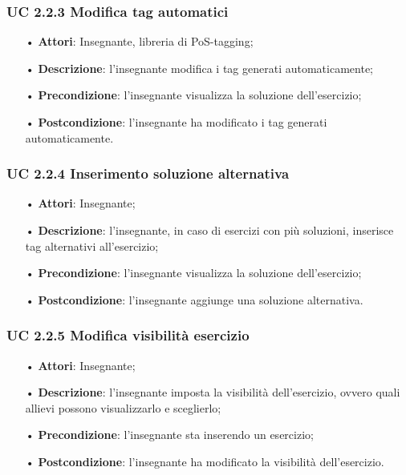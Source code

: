 \subsubsection{UC 2.2.3 Modifica tag automatici}
\begin{itemize}
	\item[•] \textbf{Attori}: Insegnante, libreria di PoS-tagging;
	\item[•] \textbf{Descrizione}: l’insegnante modifica i tag generati automaticamente;
	\item[•] \textbf{Precondizione}: l'insegnante visualizza la soluzione dell'esercizio;
	\item[•] \textbf{Postcondizione}: l'insegnante ha modificato i tag generati automaticamente.
\end{itemize}


\subsubsection{UC 2.2.4 Inserimento soluzione alternativa}
\begin{itemize}
	\item[•] \textbf{Attori}: Insegnante;
	\item[•] \textbf{Descrizione}: l'insegnante, in caso di esercizi con più soluzioni, inserisce tag alternativi all’esercizio;
	\item[•] \textbf{Precondizione}: l'insegnante visualizza la soluzione dell'esercizio;
	\item[•] \textbf{Postcondizione}: l'insegnante aggiunge una soluzione alternativa.
\end{itemize}

\subsubsection{UC 2.2.5 Modifica visibilità esercizio}
\begin{itemize}
	\item[•] \textbf{Attori}: Insegnante;
	\item[•] \textbf{Descrizione}: l'insegnante imposta la visibilità dell'esercizio, ovvero quali allievi possono visualizzarlo e sceglierlo;
	\item[•] \textbf{Precondizione}: l'insegnante sta inserendo un esercizio;
	\item[•] \textbf{Postcondizione}: l'insegnante ha modificato la visibilità dell'esercizio.
\end{itemize}
